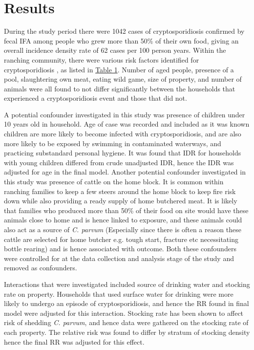\documentclass[12pt]{article}
\begin{document}
	\section{Results}
		During the study period there were 1042 cases of cryptosporidiosis confirmed by fecal IFA among people who grew more than 50\% of their own food, giving an overall incidence density rate of 62 cases per 100 person years.
		Within the ranching community, there were various risk factors identified for cryptosporidiosis , as listed in \hyperref[table1]{Table 1}. 
		Number of aged people, presence of a pool, slaughtering own meat, eating wild game, size of property, and number of animals were all found to not differ significantly between the households that experienced a cryptosporidiosis event and those that did not. 


		A potential confounder investigated in this study was presence of children under 10 years old in household.
		Age of case was recorded and included as it was known children are more likely to become infected with cryptosporidiosis, and are also more likely to be exposed by swimming in contaminated waterways, and practicing substandard personal hygiene.
		It was found that IDR for households with young children differed from crude unadjusted IDR, hence the IDR was adjusted for age in the final model.
		Another potential confounder investigated in this study was presence of cattle on the home block.
		It is common within ranching families to keep a few steers around the home block to keep fire risk down while also providing a ready supply of home butchered meat.
		It is likely that families who produced more than 50\% of their food on site would have these animals close to home and is hence linked to exposure, and these animals could also act as a source of \emph{C. parvum} (Especially since there is often a reason these cattle are selected for home butcher e.g. tough start, fracture etc necessitating bottle rearing) and is hence associated with outcome.
		Both these confounders were controlled for at the data collection and analysis stage of the study and removed as confounders.


		Interactions that were investigated included source of drinking water and stocking rate on property.
		Households that used surface water for drinking were more likely to undergo an episode of cryptosporidiosis, and hence the RR found in final model were adjusted for this interaction.
		Stocking rate has been shown to affect risk of shedding \emph{C. parvum}\cite{Atwill1999}, and hence data were gathered on the stocking rate of each property.
		The relative risk was found to differ by stratum of stocking density hence the final RR was adjusted for this effect.
\end{document}
